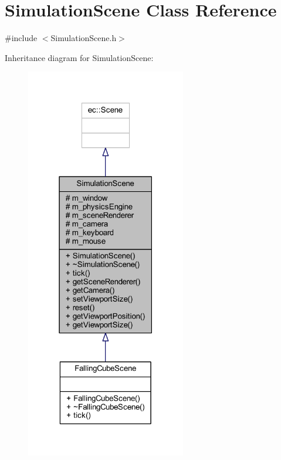 \hypertarget{class_simulation_scene}{}\section{Simulation\+Scene Class Reference}
\label{class_simulation_scene}


{\ttfamily \#include $<$Simulation\+Scene.\+h$>$}



Inheritance diagram for Simulation\+Scene\+:\nopagebreak
\begin{figure}[H]
\begin{center}
\leavevmode
\includegraphics[width=198pt]{class_simulation_scene__inherit__graph}
\end{center}
\end{figure}


